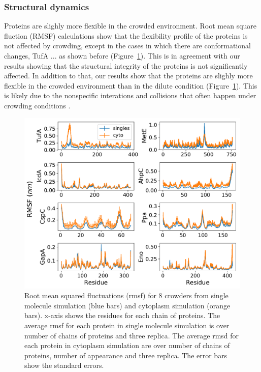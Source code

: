 \documentclass[journal=jacsat,manuscript=article]{achemso}
\begin{document}


\subsubsection{Structural dynamics}
Proteins are slighly more flexible in the crowded environment. Root mean square fluction (RMSF) calculations show that the flexibility profile of the proteins is not affected by crowding, except in the cases in which there are conformational changes, TufA ... as shown before (Figure~\ref{fig:rmsf}). This is in agreement with our results showing that the structural integrity of the proteins is not significantly affected. In addition to that, our results show that the proteins are slighly more flexible in the crowded environment than in the dilute condition (Figure~\ref{fig:rmsf}). This is likely due to the nonspecific interations and collisions that often happen under crowding conditions \textbf{\color{red}{REF}}.


\begin{figure}[H]
\includegraphics[scale=0.5]{rmsf.pdf}
\caption{Root mean squared fluctuations (rmsf) for 8 crowders from single molecule simulation (blue bars) and cytoplasm simulation (orange bars). x-axis shows the residues for each chain of proteins. The average rmsf for each protein in single molecule simulation is over number of chains of proteins and three replica. The average rmsd for each protein in cytoplasm simulation are over number of chains of proteins, number of appearance and three replica. The error bars show the standard errors.}
\label{fig:rmsf}
\end{figure}
\end{document}
